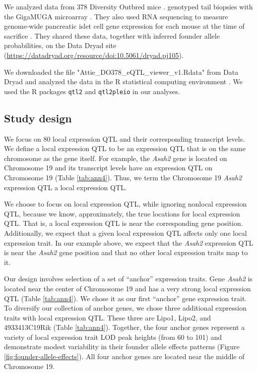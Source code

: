\documentclass{article}
\begin{document}
We analyzed data from 378 Diversity Outbred mice \citep{keller2018genetic}. \citet{keller2018genetic} genotyped tail biopsies with the GigaMUGA microarray \citep{morgan2016mouse}. They also used RNA sequencing to measure genome-wide pancreatic islet cell gene expression for each mouse at the time of sacrifice \citep{keller2018genetic}. They shared these data, together with inferred founder allele probabilities, on the Data Dryad site (\url{https://datadryad.org/resource/doi:10.5061/dryad.pj105}). 

We downloaded the file "Attie\_DO378\_eQTL\_viewer\_v1.Rdata" from Data Dryad \citep{keller2018genetic} and analyzed the data in the R statistical computing environment \citep{r}. We used the R packages \texttt{qtl2} \citep{broman2018} and \texttt{qtl2pleio} \citep{qtl2pleio} in our analyses. 

\subsection{Study design}

We focus on 80 local expression QTL and their corresponding transcript levels. We define a local expression QTL to be an expression QTL that is on the same chromosome as the gene itself. For example, the \emph{Asah2} gene is located on Chromosome 19 and its transcript levels have an expression QTL on Chromosome 19 (Table \ref{tab:ann4}). Thus, we term the Chromosome 19 \emph{Asah2} expression QTL a local expression QTL. 

We choose to focus on local expression QTL, while ignoring nonlocal expression QTL, because we know, approximately, the true locations for local expression QTL. That is, a local expression QTL is near the corresponding gene position. Additionally, we expect that a given local expression QTL affects only one local expression trait. In our example above, we expect that the \emph{Asah2} expression QTL is near the \emph{Asah2} gene position and that no other local expression traits map to it.


Our design involves selection of a set of ``anchor'' expression traits. Gene \emph{Asah2} is located near the center of Chromosome 19 and has a very strong local expression QTL (Table \ref{tab:ann4}). We chose it as our first ``anchor'' gene expression trait. To diversify our collection of anchor genes, we chose three additional expression traits with local expression QTL. These three are Lipo1, Lipo2, and 4933413C19Rik (Table \ref{tab:ann4}). Together, the four anchor genes represent a variety of local expression trait LOD peak heights (from 60 to 101) and demonstrate modest variability in their founder allele effects patterns (Figure \ref{fig:founder-allele-effects}). All four anchor genes are located near the middle of Chromosome 19.  
\end{document}
